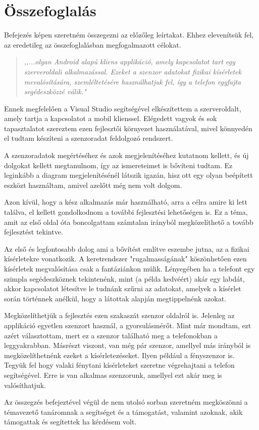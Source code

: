\documentclass{thesis-ekf}
\theoremstyle{definition}
\theoremstyle{remark}
\begin{document}
\chapter{Összefoglalás}
Befejezés képen szeretném összegezni az előzőleg leírtakat. Ehhez elevenítsük fel, az eredetileg az összefoglalásban megfogalmazott célokat.
\begin{quote}
	\it ,,...olyan Android alapú kliens applikáció, amely kapcsolatot tart egy szerveroldali alkalmazással. Ezeket a szenzor adatokat fizikai kísérletek mevalósítására, szemléltetésére használhatjuk fel, így a telefon egyfajta segédeszközzé válik."
\end{quote}
Ennek megfelelően a Visual Studio segítségével elkészítettem a szerveroldalt, amely tartja a kapcsolatot a mobil klienssel. Elégedett vagyok és sok tapasztalatot szereztem ezen fejlesztői környezet használatával, mivel könnyedén el tudtam készíteni a szenzoradat feldolgozó rendszert.
\par A szenzoradatok megértéséhez és azok megjelenítéséhez kutatnom kellett, és új dolgokat kellett megtanulnom, így az ismereteimet is bővíteni tudtam. Ez leginkább a diagram megjelenítésénél látszik igazán, hisz ott egy olyan beépített eszközt használtam, amivel azelőtt még nem volt dolgom.
\par Azon kívül, hogy a kész alkalmazás már használható, arra a célra amire ki lett találva, el kellett gondolkodnom a további fejlesztési lehetőségen is. Ez a téma, amit az első oldal óta boncolgattam számtalan irányból megközelíthető a tovább fejlesztést tekintve.
\par Az első és legfontosabb dolog ami a bővítést említve eszembe jutna, az a fizikai kísérletekre vonatkozik. A keretrendszer "rugalmasságának" köszönhetően ezen kísérletek megvalósítása csak a fantáziánkon múlik. Lényegében ha a telefont egy szimpla segédeszköznek tekintenénk, mint (a példa kedvéért) akár egy labdát, akkor kapcsolatot létesítve le tudnánk szűrni az adatokat, amelyek a kísérlet során történnek anélkül, hogy a látottak alapján megtippelnénk azokat.
\par Megközelíthetjük a fejlesztés ezen szakaszát szenzor oldalról is. Jelenleg az applikáció egyetlen szenzort használ, a gyorsulásmérőt. Mint már mondtam, ezt azért választottam, mert ez a szenzor található meg a telefonokban a leggyakrabban. Másrészt viszont, van még pár szenzor, amellyel más irányból is megközelíthetnénk ezeket a kísérletezéseket. Ilyen például a fényszenzor is. Tegyük fel hogy valaki fénytani kísérleteket szeretne végrehajtani a telefon segítségével. Erre is van alkalmas szenzorunk, amellyel ezt akár meg is valósíthatjuk.
\par Az összegzés befejeztével végül de nem utolsó sorban szeretném megköszönni a témavezető tanáromnak a segítséget és a támogatást, valamint azoknak, akik támogattak és segítettek ha kérdésem volt.
\end{document}
